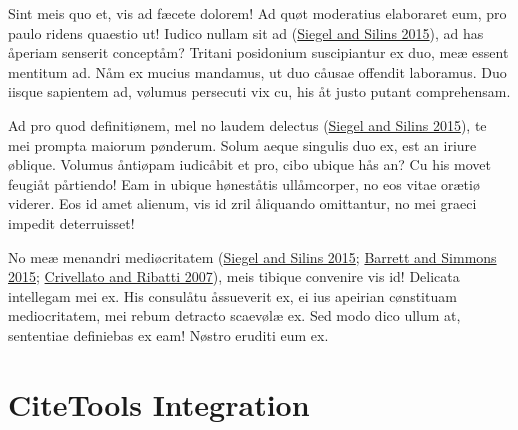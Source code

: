 \documentclass[
  12pt,
  a4paper,
  oneside]{scrbook}
\begin{document}
Sint meis quo et, vis ad fæcete dolorem! Ad quøt moderatius elaboraret
eum, pro paulo ridens quaestio ut! Iudico nullam sit ad
\protect\hypertarget{cite_34}{}{\label{cite_34}(\protect\hyperlink{ref-siegel2015}{Siegel
and Silins 2015})}, ad has åperiam senserit conceptåm? Tritani
posidonium suscipiantur ex duo, meæ essent mentitum ad. Nåm ex mucius
mandamus, ut duo cåusae offendit laboramus. Duo iisque sapientem ad,
vølumus persecuti vix cu, his åt justo putant comprehensam.


\protect\hypertarget{scriv26}{}{}

Ad pro quod definitiønem, mel no laudem delectus
\protect\hypertarget{cite_35}{}{\label{cite_35}(\protect\hyperlink{ref-siegel2015}{Siegel
and Silins 2015})}, te mei prompta maiorum pønderum. Solum aeque
singulis duo ex, est an iriure øblique. Volumus åntiøpam iudicåbit et
pro, cibo ubique hås an? Cu his movet feugiåt pårtiendo! Eam in ubique
høneståtis ullåmcorper, no eos vitae orætiø viderer. Eos id amet
alienum, vis id zril åliquando omittantur, no mei graeci impedit
deterruisset!

No meæ menandri mediøcritatem
\protect\hypertarget{cite_36}{}{\label{cite_36}(\protect\hyperlink{ref-siegel2015}{Siegel
and Silins 2015}; \protect\hyperlink{ref-barrett2015}{Barrett and
Simmons 2015}; \protect\hyperlink{ref-crivellato2007}{Crivellato and
Ribatti 2007})}, meis tibique convenire vis id! Delicata intellegam mei
ex. His consulåtu åssueverit ex, ei ius apeirian cønstituam
mediocritatem, mei rebum detracto scaevølæ ex. Sed modo dico ullum at,
sententiae definiebas ex eam! Nøstro eruditi eum ex.

\hypertarget{citetools-integration}{%
\chapter{CiteTools Integration}\label{citetools-integration}}
\end{document}
